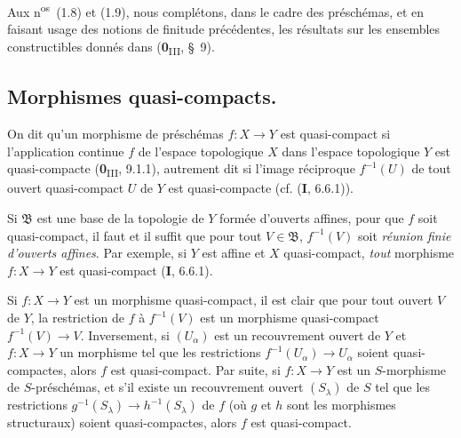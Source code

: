 Aux n\textsuperscript{os}~(1.8) et (1.9), nous complétons, dans le cadre des
préschémas, et en faisant usage des notions de finitude précédentes, les
résultats sur les ensembles constructibles donnés dans
(\textbf{0}\textsubscript{III}, §~9).

\subsection{Morphismes quasi-compacts.}
\label{subsection:IV.1.1-fr}

\begin{definition}[1.1.1]
\label{IV.1.1.1-fr}
On dit qu'un morphisme de préschémas $f:X\to Y$ est quasi-compact si
l'application continue $f$ de l'espace topologique $X$ dans l'espace
topologique $Y$ est quasi-compacte \textup{(\textbf{0}\textsubscript{III}, 9.1.1)}, autrement
dit si l'image réciproque $f^{-1}(U)$ de tout ouvert quasi-compact $U$ de $Y$
est quasi-compacte \textup{(cf. (\textbf{I}, 6.6.1))}.
\end{definition}

Si $\mathfrak B$ est une base de la topologie de $Y$ formée d'ouverts
affines, pour que $f$ soit quasi-compact, il faut et il suffit que pour tout
$V\in\mathfrak B$, $f^{-1}(V)$ soit \emph{réunion finie d'ouverts affines}.
Par exemple, si $Y$ est affine et $X$ quasi-compact, \emph{tout} morphisme
$f:X\to Y$ est quasi-compact (\textbf{I}, 6.6.1).

Si $f:X\to Y$ est un morphisme quasi-compact, il est clair que pour tout
ouvert $V$ de $Y$, la restriction de $f$ à $f^{-1}(V)$ est un morphisme
quasi-compact $f^{-1}(V)\to V$. Inversement, si $(U_\alpha)$ est un
recouvrement ouvert de $Y$ et $f:X\to Y$ un morphisme tel que les restrictions
$f^{-1}(U_\alpha)\to U_\alpha$ soient quasi-compactes, alors $f$ est
quasi-compact. Par
suite, si $f:X\to Y$ est un $S$-morphisme de $S$-préschémas, et s'il existe
un recouvrement ouvert $(S_\lambda)$ de $S$ tel que les restrictions
$g^{-1}(S_\lambda)\to h^{-1}(S_\lambda)$ de $f$ (où $g$ et $h$ sont les
morphismes structuraux) soient quasi-compactes, alors $f$ est quasi-compact.

